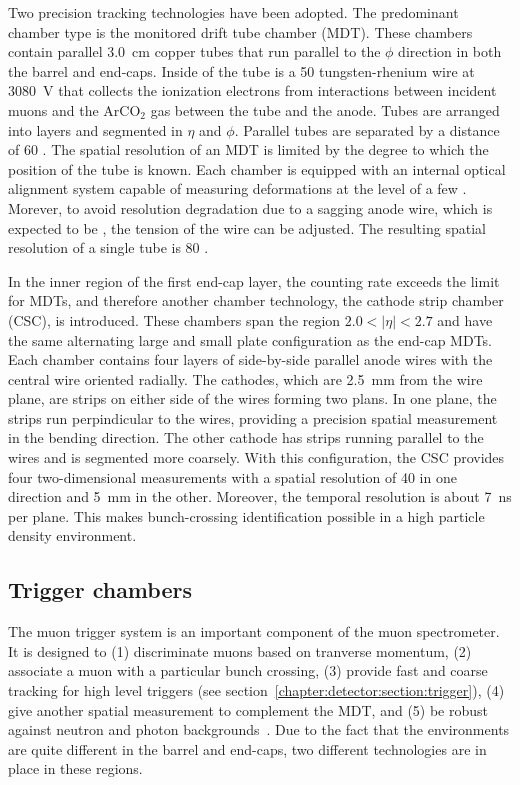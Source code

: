 Two precision tracking technologies have been adopted. The predominant
chamber type is the monitored drift tube chamber (MDT). These chambers
contain parallel 3.0~cm copper tubes that run parallel to the $\phi$
direction in both the barrel and end-caps. Inside of the tube is a 50
\micron tungsten-rhenium wire at 3080~V that collects the ionization
electrons from interactions between incident muons and the ArCO$_2$
gas between the tube and the anode. Tubes are arranged into layers and
segmented in $\eta$ and $\phi$. Parallel tubes are separated by a
distance of 60 \micron. The spatial resolution of an MDT is limited by
the degree to which the position of the tube is known. Each chamber is
equipped with an internal optical alignment system capable of
measuring deformations at the level of a few \micron. Morever, to
avoid resolution degradation due to a sagging anode wire, which is
expected to be , the tension of the wire can be
adjusted. The resulting spatial resolution of a single tube is 80
\micron. 

In the inner region of the first end-cap layer, the counting rate
exceeds the limit for MDTs, and therefore another chamber
technology, the cathode strip chamber (CSC), is introduced. These
chambers span the region $2.0 < |\eta| < 2.7$ and have the same
alternating large and small plate configuration as the end-cap
MDTs. Each chamber contains four layers of side-by-side parallel anode
wires with the central wire oriented radially. The cathodes, which are
2.5~mm from the wire plane, are strips on either side of the wires
forming two plans. In one plane, the strips run perpindicular to the
wires, providing a precision spatial measurement in the bending
direction. The other cathode has strips running parallel to the wires
and is segmented more coarsely. With this configuration, the CSC
provides four two-dimensional measurements with a spatial resolution
of 40 \micron in one direction and 5~mm in the other. Moreover, the
temporal resolution is about 7~ns per plane. This makes bunch-crossing
identification possible in a high particle density environment. 

\subsection{Trigger chambers}

The muon trigger system is an important component of the muon
spectrometer. It is designed to (1) discriminate muons based on
tranverse momentum, (2) associate a muon with a particular bunch
crossing, (3) provide fast and coarse tracking for high level triggers
(see section~\ref{chapter:detector:section:trigger}), (4) give another
spatial measurement to complement the MDT, and (5) be robust against
neutron and photon backgrounds~\cite{bib:Aad:2008zzm}. Due to the fact
that the environments are quite different in the barrel and end-caps,
two different technologies are in place in these regions. 

